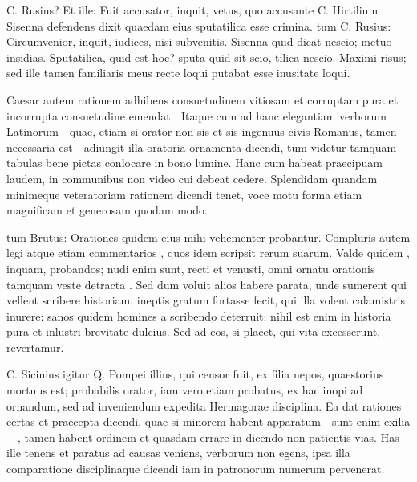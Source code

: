  C. Rusius? Et ille: Fuit accusator, inquit, vetus, quo accusante C. Hirtilium Sisenna defendens dixit quaedam eius sputatilica esse crimina. tum C. Rusius: Circumvenior, inquit, iudices, nisi subvenitis. Sisenna quid dicat nescio; metuo insidias. Sputatilica, quid est hoc? sputa quid sit scio, tilica nescio. Maximi risus; sed ille tamen familiaris meus recte loqui putabat esse inusitate loqui.

 Caesar autem rationem adhibens consuetudinem vitiosam et corruptam pura et incorrupta consuetudine emendat . Itaque cum ad hanc elegantiam verborum Latinorum—quae, etiam si orator non sis et sis ingenuus civis Romanus, tamen necessaria est—adiungit illa oratoria ornamenta dicendi, tum videtur tamquam tabulas bene pictas conlocare in bono lumine. Hanc cum habeat praecipuam laudem, in communibus non video cui debeat cedere. Splendidam quandam minimeque veteratoriam rationem dicendi tenet, voce motu forma etiam magnificam et generosam quodam modo.

 tum Brutus: Orationes quidem eius mihi vehementer probantur. Compluris autem legi atque etiam commentarios , quos idem scripsit rerum suarum. Valde quidem , inquam, probandos; nudi enim sunt, recti et venusti, omni ornatu orationis tamquam veste detracta . Sed dum voluit alios habere parata, unde sumerent qui vellent scribere historiam, ineptis gratum fortasse fecit, qui illa volent calamistris inurere: sanos quidem homines a scribendo deterruit; nihil est enim in historia pura et inlustri brevitate dulcius. Sed ad eos, si placet, qui vita excesserunt, revertamur.

 C. Sicinius igitur Q. Pompei illius, qui censor fuit, ex filia nepos, quaestorius mortuus est; probabilis orator, iam vero etiam probatus, ex hac inopi ad ornandum, sed ad inveniendum expedita Hermagorae disciplina. Ea dat rationes certas et praecepta dicendi, quae si minorem habent apparatum—sunt enim exilia—, tamen habent ordinem et quasdam errare in dicendo non patientis vias. Has ille tenens et paratus ad causas veniens, verborum non egens, ipsa illa comparatione disciplinaque dicendi iam in patronorum numerum pervenerat.

